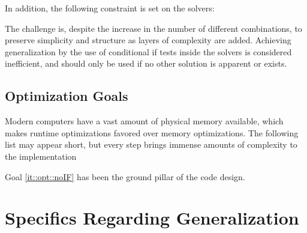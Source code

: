 In addition, the following constraint is set on the solvers:


The challenge is, despite the increase in the number of different combinations, to preserve simplicity and structure as layers of complexity are added. Achieving generalization by the use of conditional if tests inside the solvers is considered inefficient, and should only be used if no other solution is apparent or exists.

\subsection{Optimization Goals}
\label{sec:optGoals}

Modern computers have a vast amount of physical memory available, which makes runtime optimizations favored over memory optimizations. The following list may appear short, but every step brings immense amounts of complexity to the implementation


Goal \ref{it::opt::noIF} has been the ground pillar of the code design. 

\clearpage
\section{Specifics Regarding Generalization}
\label{sec:specGen}


